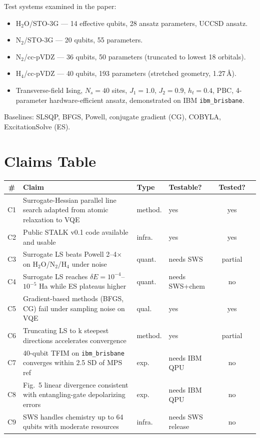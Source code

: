 \documentclass[11pt]{article}
\begin{document}
Test systems examined in the paper:
\begin{itemize}
  \item H$_2$O/STO-3G --- 14 effective qubits, 28 ansatz parameters, UCCSD ansatz.
  \item N$_2$/STO-3G --- 20 qubits, 55 parameters.
  \item N$_2$/cc-pVDZ --- 36 qubits, 50 parameters (truncated to lowest 18 orbitals).
  \item H$_4$/cc-pVDZ --- 40 qubits, 193 parameters (stretched geometry, 1.27\,\AA).
  \item Transverse-field Ising, $N_s=40$ sites, $J_1=1.0$, $J_2=0.9$, $h_t=0.4$, PBC,
        4-parameter hardware-efficient ansatz, demonstrated on IBM \texttt{ibm\_brisbane}.
\end{itemize}

Baselines: SLSQP, BFGS, Powell, conjugate gradient (CG), COBYLA, ExcitationSolve (ES).

\section{Claims Table}

\begin{longtable}{clllcc}
\toprule
\# & Claim & Type & Testable? & Tested? \\
\midrule
C1 & Surrogate-Hessian parallel line search adapted from atomic relaxation to VQE & method. & yes & yes \\
C2 & Public STALK v0.1 code available and usable & infra. & yes & yes \\
C3 & Surrogate LS beats Powell 2--4$\times$ on H$_2$O/N$_2$/H$_4$ under noise & quant. & needs SWS & partial \\
C4 & Surrogate LS reaches $\delta E = 10^{-4}$--$10^{-5}$ Ha while ES plateaus higher & quant. & needs SWS+chem & no \\
C5 & Gradient-based methods (BFGS, CG) fail under sampling noise on VQE & qual. & yes & yes \\
C6 & Truncating LS to k steepest directions accelerates convergence & method. & yes & partial \\
C7 & 40-qubit TFIM on \texttt{ibm\_brisbane} converges within 2.5 SD of MPS ref & exp. & needs IBM QPU & no \\
C8 & Fig.~5 linear divergence consistent with entangling-gate depolarizing errors & exp. & needs IBM QPU & no \\
C9 & SWS handles chemistry up to 64 qubits with moderate resources & infra. & needs SWS release & no \\
\bottomrule
\end{longtable}
\end{document}
